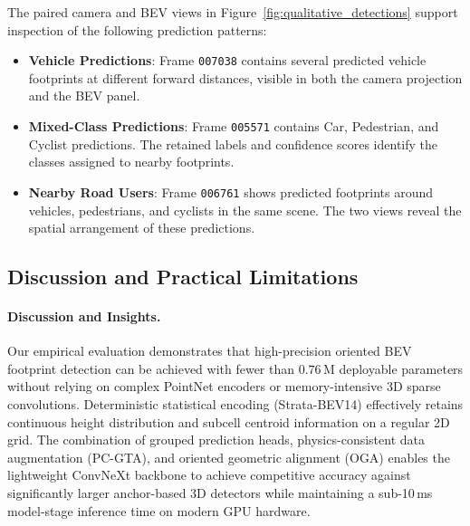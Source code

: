 The paired camera and BEV views in Figure~\ref{fig:qualitative_detections} support inspection of the following prediction patterns:
\begin{itemize}
    \item \textbf{Vehicle Predictions}: Frame \texttt{007038} contains several predicted vehicle footprints at different forward distances, visible in both the camera projection and the BEV panel.
    \item \textbf{Mixed-Class Predictions}: Frame \texttt{005571} contains Car, Pedestrian, and Cyclist predictions. The retained labels and confidence scores identify the classes assigned to nearby footprints.
    \item \textbf{Nearby Road Users}: Frame \texttt{006761} shows predicted footprints around vehicles, pedestrians, and cyclists in the same scene. The two views reveal the spatial arrangement of these predictions.
\end{itemize}

\subsection{Discussion and Practical Limitations}
\label{sec:discussion_limitations}

\paragraph{Discussion and Insights.}
Our empirical evaluation demonstrates that high-precision oriented BEV footprint detection can be achieved with fewer than $0.76\,\text{M}$ deployable parameters without relying on complex PointNet encoders or memory-intensive 3D sparse convolutions. Deterministic statistical encoding (Strata-BEV14) effectively retains continuous height distribution and subcell centroid information on a regular 2D grid. The combination of grouped prediction heads, physics-consistent data augmentation (PC-GTA), and oriented geometric alignment (OGA) enables the lightweight ConvNeXt backbone to achieve competitive accuracy against significantly larger anchor-based 3D detectors while maintaining a sub-10\,ms model-stage inference time on modern GPU hardware.

